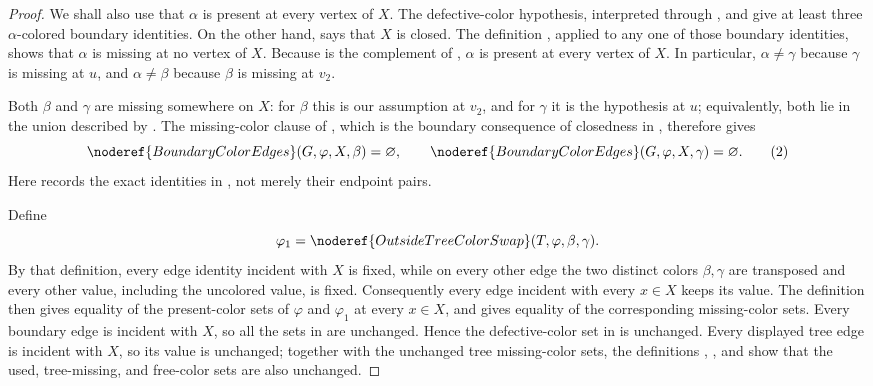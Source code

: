 \begin{proof}
We shall also use that $\alpha$ is present at every vertex of $X$.  The
defective-color hypothesis, interpreted through
, and
 give at least three
$\alpha$-colored boundary identities.  On the other hand,
 says that $X$ is closed.  The
definition , applied to any one of those
boundary identities, shows that $\alpha$ is missing at no vertex of $X$.
Because  is the complement of
, $\alpha$ is present at every vertex of $X$.
In particular, $\alpha\ne\gamma$ because $\gamma$ is missing at $u$, and
$\alpha\ne\beta$ because $\beta$ is missing at $v_2$.

Both $\beta$ and $\gamma$ are missing somewhere on $X$: for $\beta$ this
is our assumption at $v_2$, and for $\gamma$ it is the hypothesis at $u$;
equivalently, both lie in the union described by
.  The missing-color clause of
, which is the boundary
consequence of closedness in , therefore
gives
\[
 \noderef{BoundaryColorEdges}(G,\varphi,X,\beta)=\varnothing,
 \qquad
 \noderef{BoundaryColorEdges}(G,\varphi,X,\gamma)=\varnothing.   \tag{2}
\]
Here  records the exact identities in
, not merely their endpoint pairs.

Define
\[
 \varphi_1=\noderef{OutsideTreeColorSwap}(T,\varphi,\beta,\gamma).
\]
By that definition, every edge identity incident with $X$ is fixed, while
on every other edge the two distinct colors $\beta,\gamma$ are
transposed and every other value, including the uncolored value, is
fixed.  Consequently every edge incident with every $x\in X$ keeps its
value.  The definition  then gives equality of the
present-color sets of $\varphi$ and $\varphi_1$ at every $x\in X$, and
 gives equality of the corresponding missing-color
sets.  Every boundary edge is incident with $X$, so all the sets in
 are unchanged.  Hence the defective-color
set in  is unchanged.  Every displayed tree edge
is incident with $X$, so its value is unchanged; together with the
unchanged tree missing-color sets, the definitions
, , and
 show that the used, tree-missing, and free-color
sets are also unchanged.


\end{proof}
